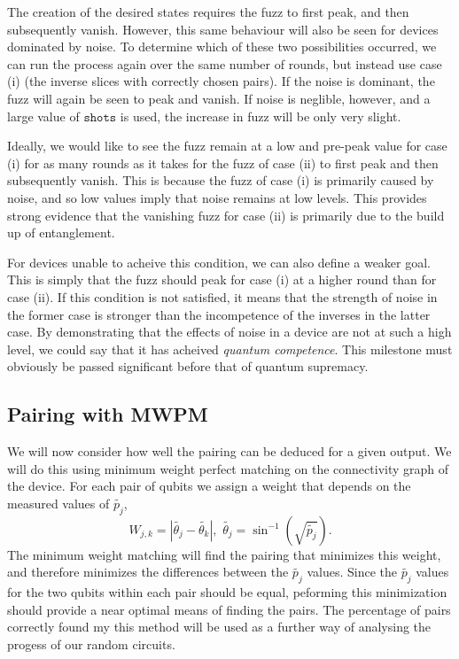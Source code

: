\documentclass[aps,prl,twocolumn,showpacs,preprintnumbers]{revtex4-1}
\newcommand{\be}{\begin{equation}}
\newcommand{\ee}{\end{equation}}
\begin{document}
The creation of the desired states requires the fuzz to first peak, and then subsequently vanish. However, this same behaviour will also be seen for devices dominated by noise. To determine which of these two possibilities occurred, we can run the process again over the same number of rounds, but instead use case (i) (the inverse slices with correctly chosen pairs). If the noise is dominant, the fuzz will again be seen to peak and vanish. If noise is neglible, however, and a large value of $\mathtt{shots}$ is used, the increase in fuzz will be only very slight.

Ideally, we would like to see the fuzz remain at a low and pre-peak value for case (i) for as many rounds as it takes for the fuzz of case (ii) to first peak and then subsequently vanish. This is because the fuzz of case (i) is primarily caused by noise, and so low values imply that noise remains at low levels. This provides strong evidence that the vanishing fuzz for case (ii) is primarily due to the build up of entanglement.

For devices unable to acheive this condition, we can also define a weaker goal. This is simply that the fuzz should peak for case (i) at a higher round than for case (ii). If this condition is not satisfied, it means that the strength of noise in the former case is stronger than the incompetence of the inverses in the latter case. By demonstrating that the effects of noise in a device are not at such a high level, we could say that it has acheived \textit{quantum competence}. This milestone must obviously be passed significant before that of quantum supremacy.


\subsection{Pairing with MWPM}

We will now consider how well the pairing can be deduced for a given output. We will do this using minimum weight perfect matching on the connectivity graph of the device. For each pair of qubits we assign a weight that depends on the measured values of $\tilde{p_j}$,
\be \label{angle}
W_{j,k} = | \tilde{\theta_j} - \tilde{\theta_k} |, \,\, \tilde{\theta_j} = \sin^{-1}( \sqrt{\tilde{p_j}} ).
\ee
The minimum weight matching will find the pairing that minimizes this weight, and therefore minimizes the differences between the $\tilde{p_j}$ values. Since the $\tilde{p_j}$ values for the two qubits within each pair should be equal, peforming this minimization should provide a near optimal means of finding the pairs. The percentage of pairs correctly found my this method will be used as a further way of analysing the progess of our random circuits.
\end{document}
